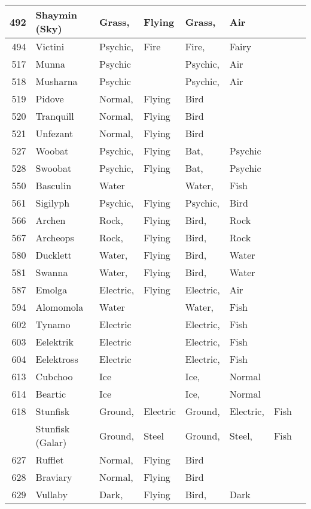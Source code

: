 \documentclass{article}
\begin{document}
\begin{longtable}{rl|ll|llll}
492 & Shaymin (Sky) & Grass, & Flying & Grass, & Air &  &  \\
\hline %
494 & Victini & Psychic, & Fire & Fire, & Fairy &  &  \\
517 & Munna & Psychic &  & Psychic, & Air &  &  \\
518 & Musharna & Psychic &  & Psychic, & Air &  &  \\
519 & Pidove & Normal, & Flying & Bird &  &  &  \\
520 & Tranquill & Normal, & Flying & Bird &  &  &  \\
521 & Unfezant & Normal, & Flying & Bird &  &  &  \\
527 & Woobat & Psychic, & Flying & Bat, & Psychic &  &  \\
528 & Swoobat & Psychic, & Flying & Bat, & Psychic &  &  \\
550 & Basculin & Water &  & Water, & Fish &  &  \\
561 & Sigilyph & Psychic, & Flying & Psychic, & Bird &  &  \\
566 & Archen & Rock, & Flying & Bird, & Rock &  &  \\
567 & Archeops & Rock, & Flying & Bird, & Rock &  &  \\
580 & Ducklett & Water, & Flying & Bird, & Water &  &  \\
581 & Swanna & Water, & Flying & Bird, & Water &  &  \\
587 & Emolga & Electric, & Flying & Electric, & Air &  &  \\
594 & Alomomola & Water &  & Water, & Fish &  &  \\
602 & Tynamo & Electric &  & Electric, & Fish &  &  \\
603 & Eelektrik & Electric &  & Electric, & Fish &  &  \\
604 & Eelektross & Electric &  & Electric, & Fish &  &  \\
613 & Cubchoo & Ice &  & Ice, & Normal &  &  \\
614 & Beartic & Ice &  & Ice, & Normal &  &  \\
618 & Stunfisk & Ground, & Electric & Ground, & Electric, & Fish &  \\
    & Stunfisk (Galar) & Ground, & Steel & Ground, & Steel, & Fish &  \\
627 & Rufflet & Normal, & Flying & Bird &  &  &  \\
628 & Braviary & Normal, & Flying & Bird &  &  &  \\
629 & Vullaby & Dark, & Flying & Bird, & Dark &  &  \\

\end{longtable}
\end{document}

